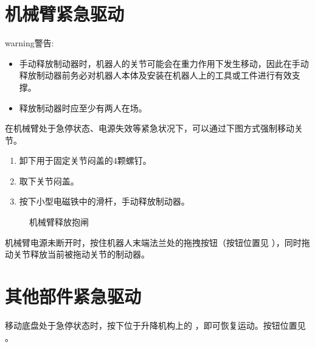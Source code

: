 \documentclass[a4paper,11pt,english,openany,oneside]{sphinxmanual}
\begin{document}
\section{机械臂紧急驱动}
\label{\detokenize{05-_u7d27_u6025_u9a71_u52a8:id2}}
\begin{sphinxadmonition}{warning}{警告:}\begin{itemize}
\item {} 
\sphinxAtStartPar
手动释放制动器时，机器人的关节可能会在重力作用下发生移动，因此在手动释放制动器前务必对机器人本体及安装在机器人上的工具或工件进行有效支撑。

\item {} 
\sphinxAtStartPar
释放制动器时应至少有两人在场。

\end{itemize}
\end{sphinxadmonition}

\sphinxAtStartPar
在机械臂处于急停状态、电源失效等紧急状况下，可以通过下图方式强制移动关节。
\begin{enumerate}
%
\item {} 
\sphinxAtStartPar
卸下用于固定关节闷盖的4颗螺钉。

\item {} 
\sphinxAtStartPar
取下关节闷盖。

\item {} 
\sphinxAtStartPar
按下小型电磁铁中的滑杆，手动释放制动器。

\end{enumerate}

\begin{figure}[H]
\centering
\capstart

\noindent{}
\caption{机械臂释放抱闸}\label{\detokenize{05-_u7d27_u6025_u9a71_u52a8:id4}}\end{figure}



\sphinxAtStartPar
机械臂电源未断开时，按住机器人末端法兰处的拖拽按钮（按钮位置见 {\hyperref[\detokenize{07 _u6280_u672f_u89c4_u683c:id22}]{}} ），同时拖动关节释放当前被拖动关节的制动器。


\section{其他部件紧急驱动}
\label{\detokenize{05-_u7d27_u6025_u9a71_u52a8:id3}}
\sphinxAtStartPar
移动底盘处于急停状态时，按下位于升降机构上的  ，即可恢复运动。按钮位置见 {\hyperref[\detokenize{07 _u6280_u672f_u89c4_u683c:id22}]{}} 。
\end{document}
